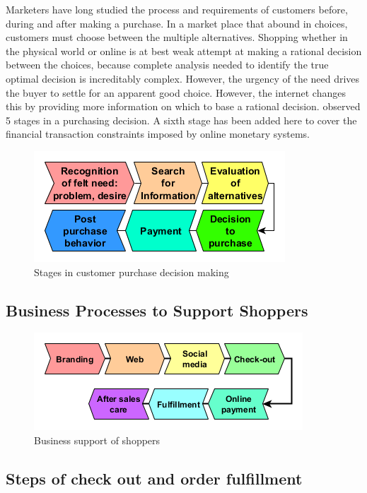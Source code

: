 \documentclass[]{book}
\begin{document}
Marketers have long studied the process and requirements of customers before, during and after making a purchase. In a market place that abound in choices, customers must choose between the multiple alternatives. Shopping whether in the physical world or online is at best weak attempt at making a rational decision between the choices, because complete analysis needed to identify the true optimal decision is increditably complex. \citep{Simon1955} However, the urgency of the need drives the buyer to settle for an apparent good choice. However, the internet changes this by providing more information on which to base a rational decision. \citep{Dewey1910} observed 5 stages in a purchasing decision. A sixth stage has been added here to cover the financial transaction constraints imposed by online monetary systems.

\begin{figure}
\centering
\includegraphics{images/purchase.png}
\caption{Stages in customer purchase decision making}
\end{figure}

\hypertarget{business-processes-to-support-shoppers}{%
\subsection{Business Processes to Support Shoppers}\label{business-processes-to-support-shoppers}}

\begin{figure}
\centering
\includegraphics{images/onlinesales.png}
\caption{Business support of shoppers}
\end{figure}

\hypertarget{steps-of-check-out-and-order-fulfillment}{%
\subsection{Steps of check out and order fulfillment}\label{steps-of-check-out-and-order-fulfillment}}
\end{document}
